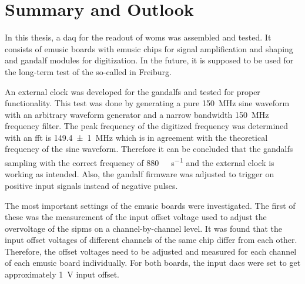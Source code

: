 \chapter{Summary and Outlook}
In this thesis, a \ac{daq} for the readout of \acp{wom} was assembled and tested.
It consists of \ac{emusic} boards with \ac{emusic} chips for signal amplification and shaping and \ac{gandalf} modules for digitization.
In the future, it is supposed to be used for the long-term test of the so-called  in Freiburg.

An external clock was developed for the \acp{gandalf} and tested for proper functionality.
This test was done by generating a pure \SI{150}{\mega\hertz} sine waveform with an arbitrary waveform generator and a narrow bandwidth \SI{150}{\mega\hertz} frequency filter.
The peak frequency of the digitized frequency was determined with an \ac{fft} is \SI{149.4(10)}{\mega\hertz} which is in agreement with the theoretical frequency of the sine waveform.
Therefore it can be concluded that the \acp{gandalf} sampling with the correct frequency of \SI{880}{\mega\sample\per\second} and the external clock is working as intended.
Also, the \ac{gandalf} firmware was adjusted to trigger on positive input signals instead of negative pulses.

The most important settings of the \ac{emusic} boards were investigated.
The first of these was the measurement of the input offset voltage used to adjust the overvoltage of the \acp{sipm} on a channel-by-channel level.
It was found that the input offset voltages of different channels of the same chip differ from each other.
Therefore, the offset voltages need to be adjusted and measured for each channel of each \ac{emusic} board individually. 
For both boards, the input \acp{dac} were set to get approximately \SI{1}{\volt} input offset.


